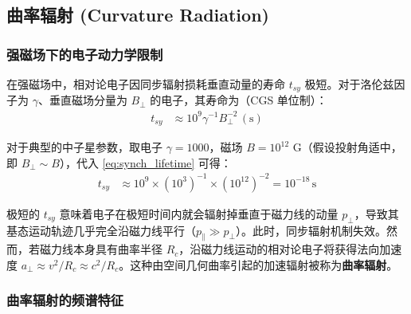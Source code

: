 \subsection{曲率辐射 (Curvature Radiation)}


\subsubsection{强磁场下的电子动力学限制}

\begin{theorem}[同步辐射冷却时标]
在强磁场中，相对论电子因同步辐射损耗垂直动量的寿命 $t_{sy}$ 极短。对于洛伦兹因子为 $\gamma$、垂直磁场分量为 $B_{\perp}$ 的电子，其寿命为（CGS 单位制）：
\begin{align}
t_{sy} &\approx 10^{9} \gamma^{-1} B_{\perp}^{-2} \, (\text{s}) \label{eq:synch_lifetime}
\end{align}
\end{theorem}

\begin{example}[中子星环境下的冷却]
对于典型的中子星参数，取电子 $\gamma = 1000$，磁场 $B = 10^{12}\text{ G}$（假设投射角适中，即 $B_{\perp} \sim B$），代入 \eqref{eq:synch_lifetime} 可得：
\begin{align}
t_{sy} &\approx 10^{9} \times (10^3)^{-1} \times (10^{12})^{-2} = 10^{-18} \, \text{s}
\end{align}
\end{example}

\begin{derivationnote}
极短的 $t_{sy}$ 意味着电子在极短时间内就会辐射掉垂直于磁力线的动量 $p_{\perp}$，导致其基态运动轨迹几乎完全沿磁力线平行（$p_{\parallel} \gg p_{\perp}$）。此时，同步辐射机制失效。然而，若磁力线本身具有曲率半径 $R_c$，沿磁力线运动的相对论电子将获得法向加速度 $a_{\perp} \approx v^2/R_c \approx c^2/R_c$。这种由空间几何曲率引起的加速辐射被称为\textbf{曲率辐射}。
\end{derivationnote}

\subsubsection{曲率辐射的频谱特征}

